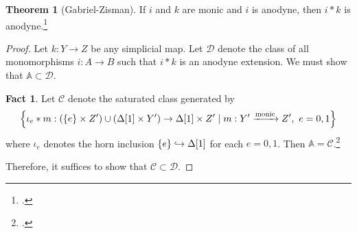 \documentclass[10pt,letterpaper,cm]{nupset}
\theoremstyle{definition}
\theoremstyle{theorem}
\newtheorem{theorem}[definition]{Theorem}
\newtheorem*{fact}{Fact}
\theoremstyle{remark}
\newcommand{\D}{\mathcal D}
\newcommand{\0}{\mathbf{0}}
\newcommand{\1}{\mathbf{1}}
\newcommand{\2}{\mathbf{2}}
\begin{document}
\begin{theorem}[Gabriel-Zisman]
If $i$ and $k$ are monic and $i$ is anodyne, then $i \mathbin{\ast} k$ is anodyne.\footnote{\cite[Theorem 3.2.2]{Joyal}.}
\end{theorem}
\begin{proof}
Let $k : Y \to Z$ be any simplicial map. Let $\D$ denote the class of all monomorphisms $i: A \to B$ such that $i\mathbin{\ast}k$ is an anodyne extension. We must show that $\mathbb{A} \subset \D$.
\begin{fact}
Let $\mathcal{C}$ denote the saturated class generated by 
\[
\mleft\{ {\iota_e}\mathbin{\ast}{m} : \mleft(\mleft\{e\mright\}\times Z'\mright) \cup \mleft(\Delta[1] \times Y'\mright) \to \Delta[1] \times Z'\mid m : Y' \xrightarrow{\text{monic}} Z', \ e=0,1   \mright\}
\] where $\iota_e$ denotes the horn inclusion  $\mleft\{e\mright\}\hookrightarrow \Delta[1]$ for each $e=0,1$. Then $\mathbb{A} = \mathcal{C}$.\footnote{\cite[Theorem 3.2.3]{Joyal}.}
\end{fact}
Therefore, it suffices to show that $\mathcal{C}\subset \D$.

\medskip


\end{proof}
\end{document}
